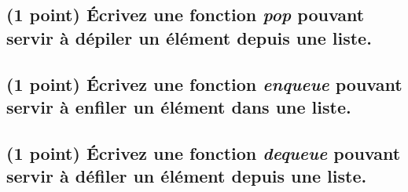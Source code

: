 \documentclass[11pt,a4paper]{article}
\begin{document}
\bigskip

\begin{center}
\end{center}

\newpage

\subsection{(1 point) \'Ecrivez une fonction \og \textit{pop} \fg{} pouvant servir à dépiler un élément depuis une liste. }

\bigskip

\begin{center}
\end{center}

\bigskip




\subsection{(1 point) \'Ecrivez une fonction \og \textit{enqueue} \fg{} pouvant servir à enfiler un élément dans une liste. }

\bigskip

\begin{center}
\end{center}


\subsection{(1 point) \'Ecrivez une fonction \og \textit{dequeue} \fg{} pouvant servir à défiler un élément depuis une liste. }

\bigskip

\begin{center}
\end{center}

\bigskip
\end{document}

